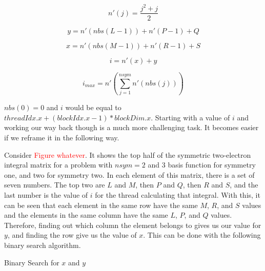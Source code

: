 \documentclass[12pt]{book}
\newcommand{\notetodylan}[1]{\textcolor{red}{#1}} %
\begin{document}
\begin{equation}
\label{nprime}
n'(j) = \frac{j^{2}+j}{2}
\end{equation}

\begin{equation}
\label{xlpq}
y = n'(nbs(L - 1)) + n'(P - 1) + Q
\end{equation}

\begin{equation}
\label{ymrs}
x = n'(nbs(M - 1)) + n'(R - 1) + S
\end{equation}

\begin{equation}
\label{numtothread}
i = n'(x) + y
\end{equation}

\begin{equation}
\label{imax}
i_{max} = n'(\sum^{nsym}_{j = 1}n'(nbs(j)))
\end{equation}

$nbs(0) = 0$ and $i$ would be equal to $threadIdx.x + (blockIdx.x - 1) * blockDim.x$. Starting with a value of $i$ and working our way back though is a much more challenging task. It becomes easier if we reframe it in the following way.

Consider \notetodylan{Figure whatever}. It shows the top half of the symmetric two-electron integral matrix for a problem with $nsym = 2$ and 3 basis function for symmetry one, and two for symmetry two. In each element of this matrix, there is a set of seven numbers. The top two are $L$ and $M$, then $P$ and $Q$, then $R$ and $S$, and the last number is the value of $i$ for the thread calculating that integral. With this, it can be seen that each element in the same row have the same $M$, $R$, and $S$ values and the elements in the same column have the same $L$, $P$, and $Q$ values. Therefore, finding out which column the element belongs to gives us our value for $y$, and finding the row give us the value of $x$. This can be done with the following binary search algorithm. 

\begin{algorithm}
\caption{Binary Search for $x$ and $y$}
\label{bsxy}
\begin{algorithmic}

\ENDIF


		\ENDIF
	\ENDWHILE
\ENDIF

\end{algorithmic}
\end{algorithm}
\end{document}
